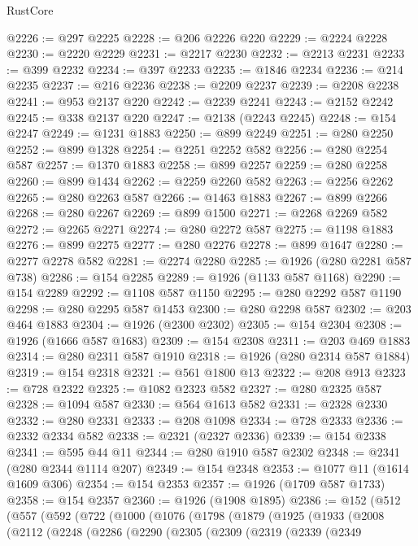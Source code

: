 \begin{lexlean}{RustCore}
\begin{coremodule}
@2226 := @297 @2225
@2228 := @206 @2226 @220
@2229 := @2224 @2228
@2230 := @2220 @2229
@2231 := @2217 @2230
@2232 := @2213 @2231
@2233 := @399 @2232
@2234 := @397 @2233
@2235 := @1846 @2234
@2236 := @214 @2235
@2237 := @216 @2236
@2238 := @2209 @2237
@2239 := @2208 @2238
@2241 := @953 @2137 @220
@2242 := @2239 @2241
@2243 := @2152 @2242
@2245 := @338 @2137 @220
@2247 := @2138 (@2243 @2245)
@2248 := @154 @2247
@2249 := @1231 @1883
@2250 := @899 @2249
@2251 := @280 @2250
@2252 := @899 @1328
@2254 := @2251 @2252 @582
@2256 := @280 @2254 @587
@2257 := @1370 @1883
@2258 := @899 @2257
@2259 := @280 @2258
@2260 := @899 @1434
@2262 := @2259 @2260 @582
@2263 := @2256 @2262
@2265 := @280 @2263 @587
@2266 := @1463 @1883
@2267 := @899 @2266
@2268 := @280 @2267
@2269 := @899 @1500
@2271 := @2268 @2269 @582
@2272 := @2265 @2271
@2274 := @280 @2272 @587
@2275 := @1198 @1883
@2276 := @899 @2275
@2277 := @280 @2276
@2278 := @899 @1647
@2280 := @2277 @2278 @582
@2281 := @2274 @2280
@2285 := @1926 (@280 @2281 @587 @738)
@2286 := @154 @2285
@2289 := @1926 (@1133 @587 @1168)
@2290 := @154 @2289
@2292 := @1108 @587 @1150
@2295 := @280 @2292 @587 @1190
@2298 := @280 @2295 @587 @1453
@2300 := @280 @2298 @587
@2302 := @203 @464 @1883
@2304 := @1926 (@2300 @2302)
@2305 := @154 @2304
@2308 := @1926 (@1666 @587 @1683)
@2309 := @154 @2308
@2311 := @203 @469 @1883
@2314 := @280 @2311 @587 @1910
@2318 := @1926 (@280 @2314 @587 @1884)
@2319 := @154 @2318
@2321 := @561 @1800 @13
@2322 := @208 @913
@2323 := @728 @2322
@2325 := @1082 @2323 @582
@2327 := @280 @2325 @587
@2328 := @1094 @587
@2330 := @564 @1613 @582
@2331 := @2328 @2330
@2332 := @280 @2331
@2333 := @208 @1098
@2334 := @728 @2333
@2336 := @2332 @2334 @582
@2338 := @2321 (@2327 @2336)
@2339 := @154 @2338
@2341 := @595 @44 @11
@2344 := @280 @1910 @587 @2302
@2348 := @2341 (@280 @2344 @1114 @207)
@2349 := @154 @2348
@2353 := @1077 @11 (@1614 @1609 @306)
@2354 := @154 @2353
@2357 := @1926 (@1709 @587 @1733)
@2358 := @154 @2357
@2360 := @1926 (@1908 @1895)
@2386 := @152
    (@512
      (@557
        (@592
          (@722
            (@1000
              (@1076
                (@1798
                  (@1879
                    (@1925
                      (@1933
                        (@2008
                          (@2112
                            (@2248
                              (@2286
                                (@2290
                                  (@2305
                                    (@2309
                                      (@2319
                                        (@2339
                                          (@2349

\end{coremodule}
\end{lexlean}
